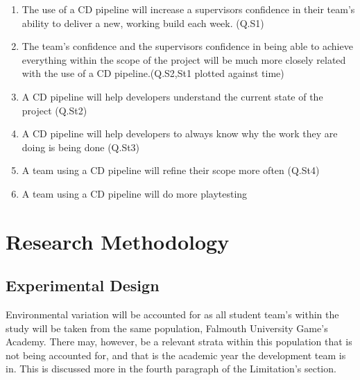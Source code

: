 \documentclass[lettersize,journal]{IEEEtran}
\begin{document}
    \begin{enumerate}
        \item \label{h1} The use of a CD pipeline will increase a supervisors confidence in their team's ability to deliver a new, working build each week. (Q.S1)
        \item \label{h2} The team's confidence and the supervisors confidence in being able to achieve everything within the scope of the project will be much more closely related with the use of a CD pipeline.(Q.S2,St1 plotted against time)
        \item \label{h3} A CD pipeline will help developers understand the current state of the project (Q.St2)
        \item \label{h4} A CD pipeline will help developers to always know why the work they are doing is being done (Q.St3)
        \item \label{h5} A team using a CD pipeline will refine their scope more often (Q.St4)
        \item \label{h6} A team using a CD pipeline will do more playtesting
    \end{enumerate}

\section{Research Methodology}
    \subsection{Experimental Design}
        Environmental variation will be accounted for as all student team's within the study will be taken from the same population, Falmouth University Game's Academy. There may, however, be a relevant strata within this population that is not being accounted for, and that is the academic year the development team is in. This is discussed more in the fourth paragraph of the Limitation's section.
    
\end{document}
